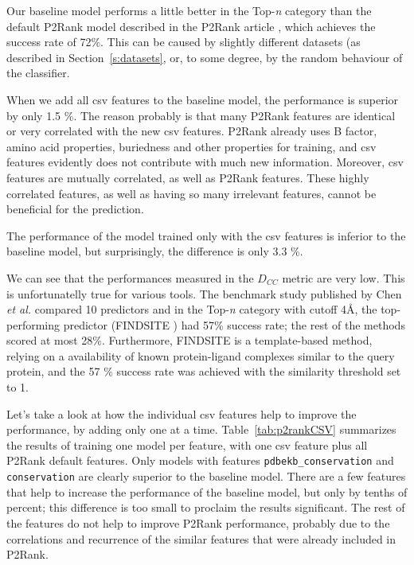 Our baseline model performs a little better in the Top-\textit{n} category than the default P2Rank model described in the P2Rank article \cite{p2rank1}, which achieves the success rate of 72\%. This can be caused by slightly different datasets (as described in Section~\ref{s:datasets}, or, to some degree, by the random behaviour of the classifier.

When we add all csv features to the baseline model, the performance is superior by only 1.5 \%. The reason probably is that many P2Rank features are identical or very correlated with the new csv features. P2Rank already uses B factor, amino acid properties, buriedness and other properties for training, and csv features evidently does not contribute with much new information. Moreover, csv features are mutually correlated, as well as P2Rank features. These highly correlated features, as well as having so many irrelevant features, cannot be beneficial for the prediction.

The performance of the model trained only with the csv features is inferior to the baseline model, but surprisingly, the difference is only 3.3 \%.

We can see that the performances measured in the $D_{CC}$ metric are very low. This is unfortunatelly true for various tools. The benchmark study published by Chen \textit{et al.} \cite{benchmark} compared 10 predictors and in the Top-\textit{n} category with cutoff 4{\AA}, the top-performing predictor (FINDSITE \cite{findsite}) had 57\% success rate; the rest of the methods scored at most 28\%. Furthermore, FINDSITE is a template-based method, relying on a availability of known protein-ligand complexes similar to the query protein, and the 57 \% success rate was achieved with the similarity threshold set to 1.

Let's take a look at how the individual csv features help to improve the performance, by adding only one at a time. Table~\ref{tab:p2rankCSV} summarizes the results of training one model per feature, with one csv feature plus all P2Rank default features. Only models with features \texttt{pdbekb\_conservation} and \texttt{conservation} are clearly superior to the baseline model. There are a few features that help to increase the performance of the baseline model, but only by tenths of percent; this difference is too small to proclaim the results significant. The rest of the features do not help to improve P2Rank performance, probably due to the correlations and recurrence of the similar features that were already included in P2Rank.

